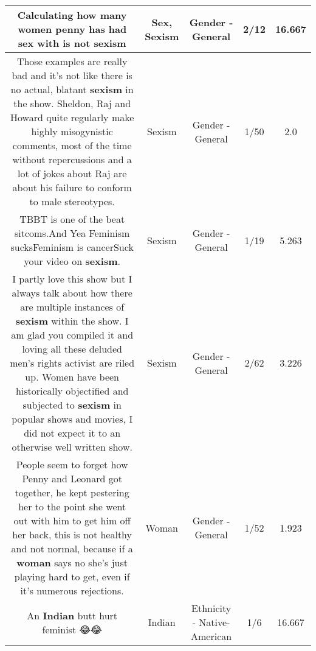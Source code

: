 \documentclass[11pt]{article}
\newlength\mylength
\begin{document}
\begin{center}
\begin{longtable}{|C{.65\mylength}|C{.30\mylength}|C{.12\mylength}|C{.12\mylength}|C{.12\mylength}|}
  \small Calculating how many women penny has had \textbf{sex} with is not sexism\normalsize   & Sex, Sexism & Gender - General & 2/12 & 16.667 \\  \hline
  \small Those examples are really bad and it's not like there is no actual, blatant \textbf{sexism} in the show. Sheldon, Raj and Howard quite regularly make highly misogynistic comments, most of the time without repercussions and a lot of jokes about Raj are about his failure to conform to male stereotypes.\normalsize   & Sexism & Gender - General & 1/50 & 2.0 \\  \hline
  \small TBBT is one of the beat sitcoms.And Yea Feminism sucksFeminism is cancerSuck your video on \textbf{sexism}.\normalsize   & Sexism & Gender - General & 1/19 & 5.263 \\  \hline
  \small I partly love this show but I always talk about how there are multiple instances of \textbf{sexism} within the show. I am glad you compiled it and loving all these deluded men's rights activist are riled up. Women have been historically objectified and subjected to \textbf{sexism} in popular shows and movies, I did not expect it to an otherwise well written show.\normalsize   & Sexism & Gender - General & 2/62 & 3.226 \\  \hline
  \small People seem to forget how Penny and Leonard got together, he kept pestering her to the point she went out with him to get him off her back, this is not healthy and not normal, because if a \textbf{woman} says no she's just playing hard to get, even if it's numerous rejections.\normalsize   & Woman & Gender - General & 1/52 & 1.923 \\  \hline
  \small An \textbf{Indian} butt hurt feminist 😂😂\normalsize   & Indian & Ethnicity - Native-American & 1/6 & 16.667 \\  \hline

\end{longtable}
\end{center}
\end{document}
